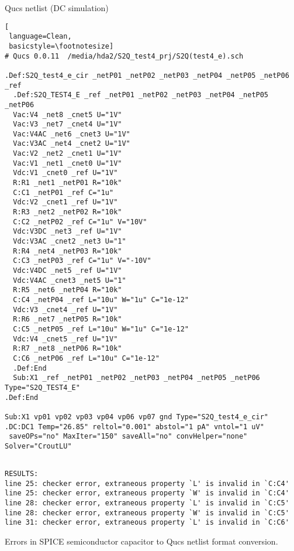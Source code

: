 \begin{flushleft}
 


Qucs netlist (DC simulation)
\begin{lstlisting}[
 language=Clean, 
 basicstyle=\footnotesize]
# Qucs 0.0.11  /media/hda2/S2Q_test4_prj/S2Q(test4_e).sch

.Def:S2Q_test4_e_cir _netP01 _netP02 _netP03 _netP04 _netP05 _netP06 _ref
  .Def:S2Q_TEST4_E _ref _netP01 _netP02 _netP03 _netP04 _netP05 _netP06
  Vac:V4 _net8 _cnet5 U="1V"
  Vac:V3 _net7 _cnet4 U="1V"
  Vac:V4AC _net6 _cnet3 U="1V"
  Vac:V3AC _net4 _cnet2 U="1V"
  Vac:V2 _net2 _cnet1 U="1V"
  Vac:V1 _net1 _cnet0 U="1V"
  Vdc:V1 _cnet0 _ref U="1V"
  R:R1 _net1 _netP01 R="10k"
  C:C1 _netP01 _ref C="1u"
  Vdc:V2 _cnet1 _ref U="1V"
  R:R3 _net2 _netP02 R="10k"
  C:C2 _netP02 _ref C="1u" V="10V"
  Vdc:V3DC _net3 _ref U="1V"
  Vdc:V3AC _cnet2 _net3 U="1"
  R:R4 _net4 _netP03 R="10k"
  C:C3 _netP03 _ref C="1u" V="-10V"
  Vdc:V4DC _net5 _ref U="1V"
  Vdc:V4AC _cnet3 _net5 U="1"
  R:R5 _net6 _netP04 R="10k"
  C:C4 _netP04 _ref L="10u" W="1u" C="1e-12"
  Vdc:V3 _cnet4 _ref U="1V"
  R:R6 _net7 _netP05 R="10k"
  C:C5 _netP05 _ref L="10u" W="1u" C="1e-12"
  Vdc:V4 _cnet5 _ref U="1V"
  R:R7 _net8 _netP06 R="10k"
  C:C6 _netP06 _ref L="10u" C="1e-12"
  .Def:End
  Sub:X1 _ref _netP01 _netP02 _netP03 _netP04 _netP05 _netP06 Type="S2Q_TEST4_E"
.Def:End

Sub:X1 vp01 vp02 vp03 vp04 vp06 vp07 gnd Type="S2Q_test4_e_cir"
.DC:DC1 Temp="26.85" reltol="0.001" abstol="1 pA" vntol="1 uV"  
 saveOPs="no" MaxIter="150" saveAll="no" convHelper="none" Solver="CroutLU"

\end{lstlisting} 
\begin{verbatim}

RESULTS:
line 25: checker error, extraneous property `L' is invalid in `C:C4' 
line 25: checker error, extraneous property `W' is invalid in `C:C4' 
line 28: checker error, extraneous property `L' is invalid in `C:C5' 
line 28: checker error, extraneous property `W' is invalid in `C:C5' 
line 31: checker error, extraneous property `L' is invalid in `C:C6' 
\end{verbatim}  
Errors in SPICE semiconductor capacitor to Qucs netlist format conversion.
\end{flushleft}




